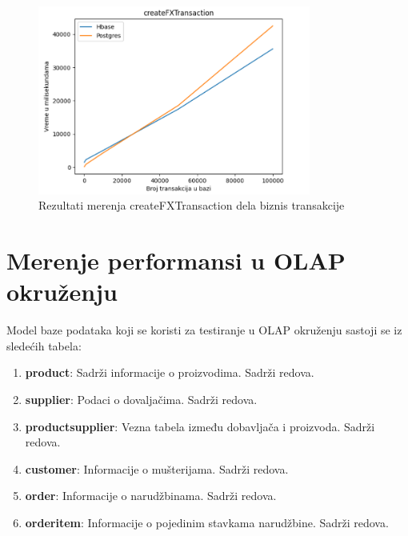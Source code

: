 \documentclass[12pt,oneside]{memoir}
\begin{document}
\begin{figure}[!ht]
  \centering
  \includegraphics[width=0.8\textwidth]{createFxTransaction-vizualization.png}
  \caption{Rezultati merenja createFXTransaction dela biznis transakcije}
  \label{fig:grafikon}
\end{figure}

\pagebreak

\section{Merenje performansi u OLAP okruženju}

Model baze podataka koji se koristi za testiranje u OLAP okruženju  sastoji se iz sledećih tabela:

\begin{enumerate}
\item[\textbullet] \textbf{product}: {
	Sadrži informacije o proizvodima. Sadrži  redova.
}
\item[\textbullet] \textbf{supplier}:{
	Podaci o dovaljačima. Sadrži   redova.
}
\item[\textbullet] \textbf{productsupplier}:{
	Vezna tabela između dobavljača i proizvoda. Sadrži   redova.
}
\item[\textbullet] \textbf{customer}:{
	Informacije o mušterijama. Sadrži   redova.
}
\item[\textbullet] \textbf{order}:{
	Informacije o narudžbinama. Sadrži   redova.
}
\item[\textbullet] \textbf{orderitem}:{
	Informacije o pojedinim stavkama narudžbine. Sadrži   redova.
}
\end{enumerate}
\end{document}
